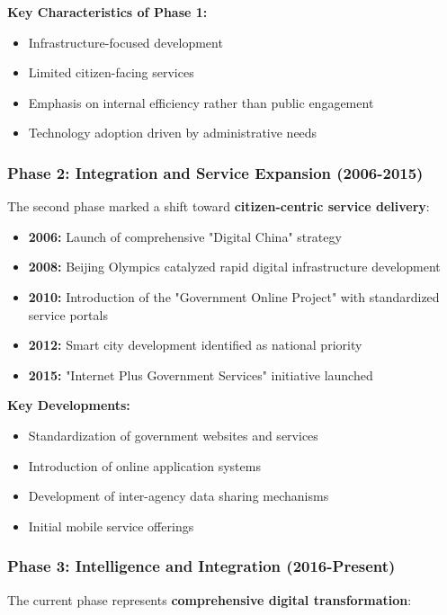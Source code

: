 \documentclass[12pt,a4paper]{article}
\begin{document}
\textbf{Key Characteristics of Phase 1:}
\begin{itemize}
    \item Infrastructure-focused development
    \item Limited citizen-facing services
    \item Emphasis on internal efficiency rather than public engagement
    \item Technology adoption driven by administrative needs
\end{itemize}

\subsubsection{Phase 2: Integration and Service Expansion (2006-2015)}

The second phase marked a shift toward \textbf{citizen-centric service delivery}:

\begin{itemize}
    \item \textbf{2006:} Launch of comprehensive "Digital China" strategy
    \item \textbf{2008:} Beijing Olympics catalyzed rapid digital infrastructure development
    \item \textbf{2010:} Introduction of the "Government Online Project" with standardized service portals
    \item \textbf{2012:} Smart city development identified as national priority
    \item \textbf{2015:} "Internet Plus Government Services" initiative launched
\end{itemize}

\textbf{Key Developments:}
\begin{itemize}
    \item Standardization of government websites and services
    \item Introduction of online application systems
    \item Development of inter-agency data sharing mechanisms
    \item Initial mobile service offerings
\end{itemize}

\subsubsection{Phase 3: Intelligence and Integration (2016-Present)}

The current phase represents \textbf{comprehensive digital transformation}:
\end{document}
